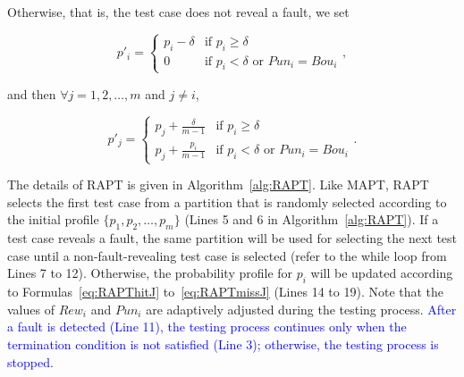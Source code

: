 \documentclass[10pt,journal,compsoc]{IEEEtran}
\begin{document}
Otherwise, that is, the test case does not reveal a fault, we set

\begin{equation}
\label{eq:RAPTmissI}
p'_i =
\begin{cases}
p_i - \delta & \text{if } p_i \geq \delta \\
0 & \text{if } p_i < \delta \text{ or } Pun_i = Bou_i
\end{cases},
\end{equation}

and then $\forall j = 1, 2, \ldots, m$ and $j \neq i$,

\begin{equation}
\label{eq:RAPTmissJ}
p'_j =
\begin{cases}
p_j + \displaystyle\frac{\delta}{m-1} & \text{if } p_i \geq \delta \\
p_j + \displaystyle\frac{p_i}{m-1} & \text{if } p_i < \delta \text{ or } Pun_i = Bou_i
\end{cases}.
\end{equation}

The details of RAPT is given in Algorithm~\ref{alg:RAPT}. Like MAPT, RAPT selects the first test case from a partition that is randomly selected according to the initial profile $\{p_1, p_2, \ldots, p_m\}$ (Lines 5 and 6 in Algorithm~\ref{alg:RAPT}). If a test case reveals a fault, the same partition will be used for selecting the next test case until a non-fault-revealing test case is selected (refer to the while loop from Lines 7 to 12). Otherwise, the probability profile for $p_i$ will be updated according to Formulas~\ref{eq:RAPThitJ} to~\ref{eq:RAPTmissJ} (Lines 14 to 19). Note that the values of $Rew_i$ and $Pun_i$ are adaptively adjusted during the testing process. \textcolor{blue}{
After a fault is detected (Line 11), the testing process continues only when the termination condition is not satisfied (Line 3); otherwise, the testing process is stopped.}
\end{document}

